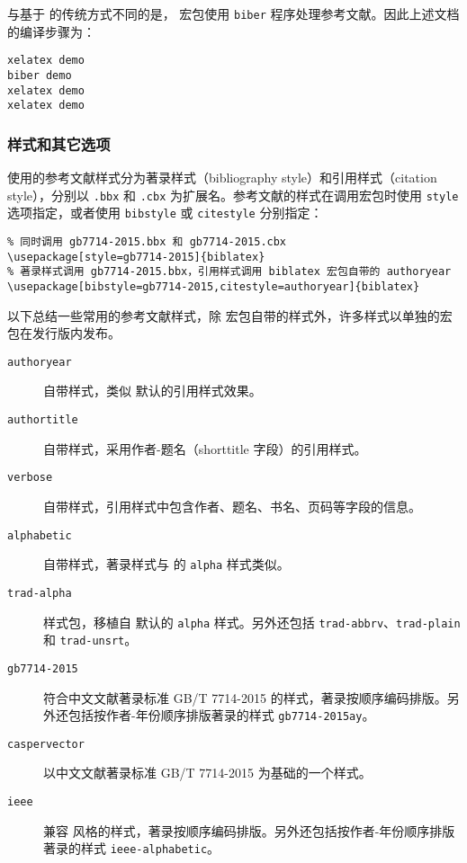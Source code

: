 与基于  的传统方式不同的是， 宏包使用 \texttt{biber} 程序处理参考文献。因此上述文档的编译步骤为：

\begin{verbatim}
xelatex demo
biber demo
xelatex demo
xelatex demo
\end{verbatim}

\subsubsection{ 样式和其它选项}

 使用的参考文献样式分为著录样式（bibliography style）和引用样式（citation style），分别以 \texttt{.bbx} 和 \texttt{.cbx} 为扩展名。参考文献的样式在调用宏包时使用 \texttt{style} 选项指定，或者使用 \texttt{bibstyle} 或 \texttt{citestyle} 分别指定：
\begin{verbatim}
% 同时调用 gb7714-2015.bbx 和 gb7714-2015.cbx
\usepackage[style=gb7714-2015]{biblatex}
% 著录样式调用 gb7714-2015.bbx，引用样式调用 biblatex 宏包自带的 authoryear
\usepackage[bibstyle=gb7714-2015,citestyle=authoryear]{biblatex}
\end{verbatim}

以下总结一些常用的参考文献样式，除  宏包自带的样式外，许多样式以单独的宏包在发行版内发布。

\begin{description}
  \item[\texttt{authoryear}]
   自带样式，类似  默认的引用样式效果。
  \item[\texttt{authortitle}]
   自带样式，采用作者-题名（shorttitle 字段）的引用样式。
  \item[\texttt{verbose}]
   自带样式，引用样式中包含作者、题名、书名、页码等字段的信息。
  \item[\texttt{alphabetic}]
   自带样式，著录样式与  的 \texttt{alpha} 样式类似。
  \item[\texttt{trad-alpha}]
   样式包，移植自  默认的 \texttt{alpha} 样式。另外还包括 \texttt{trad-abbrv}、\texttt{trad-plain} 和 \texttt{trad-unsrt}。
  \item[\texttt{gb7714-2015}]
  符合中文文献著录标准 GB/T 7714-2015 的样式，著录按顺序编码排版。另外还包括按作者-年份顺序排版著录的样式 \texttt{gb7714-2015ay}。
  \item[\texttt{caspervector}]
  以中文文献著录标准 GB/T 7714-2015 为基础的一个样式。
  \item[\texttt{ieee}]
  兼容  风格的样式，著录按顺序编码排版。另外还包括按作者-年份顺序排版著录的样式 \texttt{ieee-alphabetic}。
\end{description}


